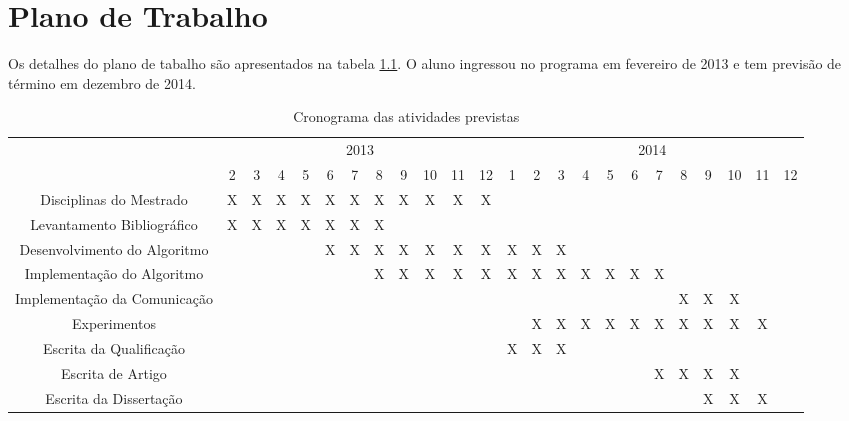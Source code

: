 \pagestyle{empty}
\cleardoublepage
\pagestyle{fancy}

\chapter{Plano de Trabalho}\label{cap7}


Os detalhes do plano de tabalho são apresentados na tabela \ref{t_cronograma}. O aluno
ingressou no programa em fevereiro de 2013 e tem previsão de término em dezembro
de 2014.

\begin{table}[!htpb]
\centering

\begin{small}

\setlength{\tabcolsep}{2pt}

\begin{tabular}{|c|c|c|c|c|c|c|c|c|c|c|c|c|c|c|c|c|c|c|c|c|c|c|c|} \hline

 & \multicolumn{11}{c|}{2013}  & \multicolumn{12}{c|}{2014}   \\ \cline{2-22}
\raisebox{1.5ex}{Etapa} & 2 & 3 & 4  & 5 & 6 & 7 & 8 & 9 & 10 & 11 & 12 & 1 & 2 & 3 & 4 & 5 & 6 & 7 & 8 & 9 & 10 & 11 & 12 \\ \hline

Disciplinas do Mestrado & X & X & X & X & X & X & X & X & X & X & X & & & & & & & & & & & & \\ \hline
Levantamento Bibliográfico & X & X & X & X & X & X & X & & & & & & & & & & & & & & & & \\ \hline
Desenvolvimento do Algoritmo & & & & & X & X & X & X & X & X & X & X & X & X & & & & & & & & & \\ \hline
Implementação do Algoritmo & & & & & & & X & X & X & X & X & X & X & X & X & X & X & X & & & & & \\ \hline
Implementação da Comunicação & & & & & & &  &  & &  &  &  &  &  & &  &  &  & X & X & X & & \\ \hline
Experimentos & & & & & & & & & & & & & X & X & X & X & X & X & X & X & X & X & \\ \hline
Escrita da Qualificação & & &  & & & & & & & & & X & X & X & & & & & & & & & \\ \hline
Escrita de Artigo & & & & & & & & & & & & & & & & & & X & X & X & X & & \\ \hline
Escrita da Dissertação & & & & & &  & & & & & & & & & & & & & & X & X & X &  \\ \hline

\end{tabular}
\end{small}
\caption{Cronograma das atividades previstas}
\label{t_cronograma}
\end{table}







